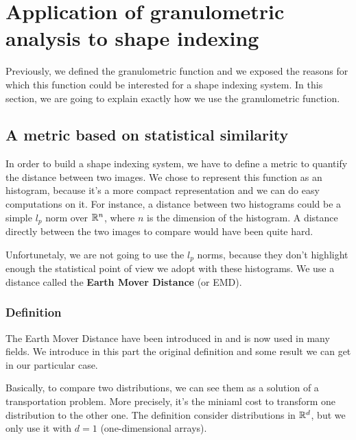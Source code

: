 \section{Application of granulometric analysis to shape indexing}

Previously, we defined the granulometric function and we exposed the reasons for which this function could be interested for a shape indexing system. In this section, we are going to explain exactly how we use the granulometric function.

\subsection{A metric based on statistical similarity}

In order to build a shape indexing system, we have to define a metric to quantify the distance between two images. We chose to represent this function as an histogram, because it's a more compact representation and we can do easy computations on it. For instance, a distance between two histograms could be a simple $l_p$ norm over $\mathbb{R}^n$, where $n$ is the dimension of the histogram. A distance directly between the two images to compare would have been quite hard.

Unfortunetaly, we are not going to use the $l_p$ norms, because they don't highlight enough the statistical point of view we adopt with these histograms. We use a distance called the \textbf{Earth Mover Distance} (or EMD).

\subsubsection{Definition}

The Earth Mover Distance have been introduced in \cite{EMD-def} and is now used in many fields. We introduce in this part the original definition and some result we can get in our particular case.

Basically, to compare two distributions, we can see them as a solution of a transportation problem. More precisely, it's the miniaml cost to transform one distribution to the other one. The definition consider distributions in $\mathbb{R}^d$, but we only use it with $d=1$ (one-dimensional arrays).

